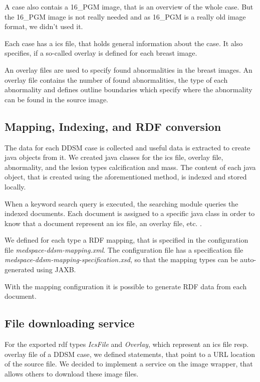 A case also contais a 16\_PGM image, that is an overview of the whole case. But the 16\_PGM image is not really needed and as 16\_PGM is a really old image format, we didn't used it.

Each case has a ics file, that holds general information about the case. It also specifies, if a so-called overlay is defined for each breast image. 

An overlay files are used to specify found abnormalities in the breast images. An overlay file contains the number of found abnormalities, the type of each abnormality and defines outline boundaries which specify where the abnormality can be found in the source image.

\subsection{Mapping, Indexing, and RDF conversion}

The data for each DDSM case is collected and useful data is extracted to create java objects from it. We created java classes for the ics file, overlay file, abnormality, and the lesion types calcification and mass. The content of each java object, that is created using the aforementioned method, is indexed and stored locally. 

When a keyword search query is executed, the searching module queries the indexed documents. Each document is assigned to a specific java class in order to know that a document represent an ics file, an overlay file, etc. .  

We defined for each type a RDF mapping, that is specified in the configuration file \emph{medspace-ddsm-mapping.xml}. The configuration file has a specification file \emph{medspace-ddsm-mapping-specification.xsd}, so that the mapping types can be auto-generated using JAXB.

With the mapping configuration it is possible to generate RDF data from each document.

\subsection{File downloading service}

For the exported rdf types \emph{IcsFile} and \emph{Overlay}, which represent an ics file resp. overlay file of a DDSM case, we defined statements, that point to a URL location of the source file. We decided to implement a service on the image wrapper, that allows others to download these image files. 

